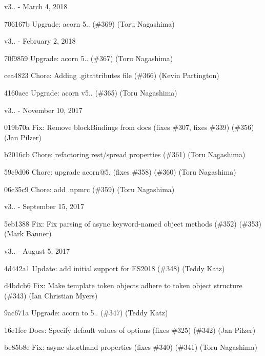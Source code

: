 v3.. -\/ March 4, 2018


\begin{DoxyItemize}
\item 706167b Upgrade\+: acorn 5.. (\#369) (Toru Nagashima)
\end{DoxyItemize}

v3.. -\/ February 2, 2018


\begin{DoxyItemize}
\item 70f9859 Upgrade\+: acorn 5.. (\#367) (Toru Nagashima)
\item cea4823 Chore\+: Adding .gitattributes file (\#366) (Kevin Partington)
\item 4160aee Upgrade\+: acorn v5.. (\#365) (Toru Nagashima)
\end{DoxyItemize}

v3.. -\/ November 10, 2017


\begin{DoxyItemize}
\item 019b70a Fix\+: Remove block\+Bindings from docs (fixes \#307, fixes \#339) (\#356) (Jan Pilzer)
\item b2016cb Chore\+: refactoring rest/spread properties (\#361) (Toru Nagashima)
\item 59c9d06 Chore\+: upgrade acorn@5. (fixes \#358) (\#360) (Toru Nagashima)
\item 06c35c9 Chore\+: add .npmrc (\#359) (Toru Nagashima)
\end{DoxyItemize}

v3.. -\/ September 15, 2017


\begin{DoxyItemize}
\item 5eb1388 Fix\+: Fix parsing of async keyword-\/named object methods (\#352) (\#353) (Mark Banner)
\end{DoxyItemize}

v3.. -\/ August 5, 2017


\begin{DoxyItemize}
\item 4d442a1 Update\+: add initial support for ES2018 (\#348) (Teddy Katz)
\item d4bdcb6 Fix\+: Make template token objects adhere to token object structure (\#343) (Ian Christian Myers)
\item 9ac671a Upgrade\+: acorn to 5.. (\#347) (Teddy Katz)
\item 16e1fec Docs\+: Specify default values of options (fixes \#325) (\#342) (Jan Pilzer)
\item be85b8e Fix\+: async shorthand properties (fixes \#340) (\#341) (Toru Nagashima)
\end{DoxyItemize}

